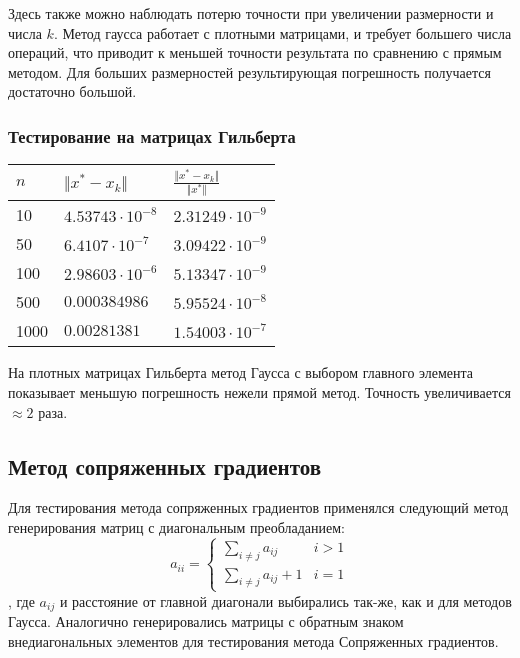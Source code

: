 \documentclass[english]{article}
\begin{document}
Здесь также можно наблюдать потерю точности при увеличении размерности
и числа \(k\). Метод гаусса работает с плотными матрицами, и требует
большего числа операций, что приводит к меньшей точности результата по
сравнению с прямым методом. Для больших размерностей результирующая
погрешность получается достаточно большой.

\subsubsection{Тестирование на матрицах Гильберта}
\begin{center}
  \begin{longtable}{l|l|l}
    \(n\) & \(\Vert x^* - x_k \Vert\) & \(\frac{\Vert x^* - x_k \Vert}{\Vert x^* \Vert}\) \\
    \hline
    10 & \(4.53743\cdot 10^{-8}\) & \(2.31249\cdot 10^{-9}\) \\
    50 & \(6.4107\cdot 10^{-7} \) & \(3.09422\cdot 10^{-9}\) \\
    100 & \(2.98603\cdot 10^{-6}\) & \(5.13347\cdot 10^{-9}\) \\
    500 & \(0.000384986\) & \(5.95524\cdot 10^{-8}\) \\
    1000 & \(0.00281381 \) & \(1.54003\cdot 10^{-7}\)
  \end{longtable}
\end{center}

На плотных матрицах Гильберта метод Гаусса с выбором главного элемента
показывает меньшую погрешность нежели прямой метод. Точность
увеличивается \(\approx 2\) раза.

\subsection{Метод сопряженных градиентов}
Для тестирования метода сопряженных градиентов применялся следующий
метод генерирования матриц с диагональным преобладанием:
\[ a_{ii} = \begin{cases}
  \sum\limits_{i \neq j} a_{ij} & i > 1 \\
  \sum\limits_{i \neq j} a_{ij} + 1 & i = 1
\end{cases} \]
, где \(a_{ij}\) и расстояние от главной диагонали выбирались так-же,
как и для методов Гаусса. Аналогично генерировались матрицы с
обратным знаком внедиагональных элементов для тестирования метода
Сопряженных градиентов.
\end{document}
